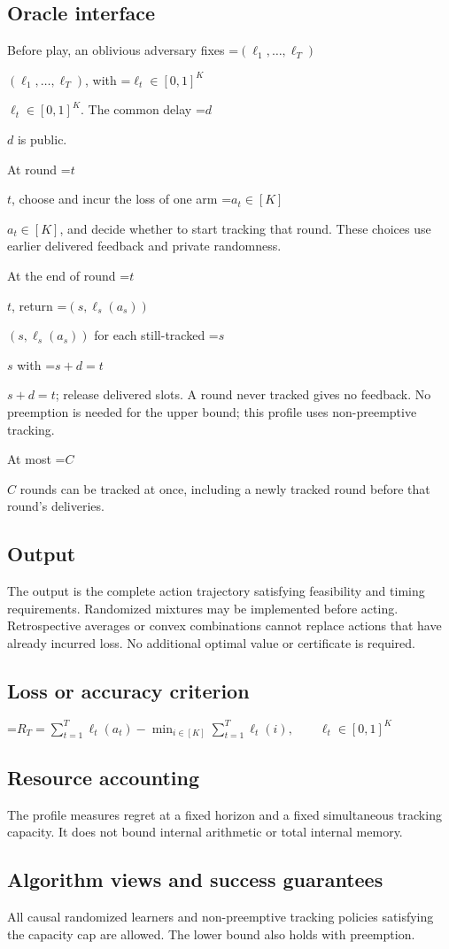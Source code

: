 \documentclass[10pt,a4paper]{article}
\newcommand{\AtlasMath}[1]{\par\begingroup\centering\setbox0=\hbox{$\displaystyle #1$}\ifdim\wd0>1.4\linewidth\typeout{ATLAS WIDE FORMULA: \the\wd0}\fi\ifdim\wd0>\linewidth\resizebox{\linewidth}{!}{\box0}\else\box0\fi\par\endgroup}
\newcommand{\AtlasInlineMath}[1]{\begingroup\setbox0=\hbox{$#1$}\ifdim\wd0>.4\linewidth\endgroup\AtlasMath{#1}\else\endgroup$#1$\fi}
\begin{document}
\subsection{Oracle interface}
Before play, an oblivious adversary fixes \AtlasInlineMath{(\ell_1,\ldots,\ell_T)}, with \AtlasInlineMath{\ell_t\in[0,1]^K}. The common delay \AtlasInlineMath{d} is public.

At round \AtlasInlineMath{t}, choose and incur the loss of one arm \AtlasInlineMath{a_t\in[K]}, and decide whether to start tracking that round. These choices use earlier delivered feedback and private randomness.

At the end of round \AtlasInlineMath{t}, return \AtlasInlineMath{(s,\ell_s(a_s))} for each still-tracked \AtlasInlineMath{s} with \AtlasInlineMath{s+d=t}; release delivered slots. A round never tracked gives no feedback. No preemption is needed for the upper bound; this profile uses non-preemptive tracking.

At most \AtlasInlineMath{C} rounds can be tracked at once, including a newly tracked round before that round's deliveries.

\subsection{Output}
The output is the complete action trajectory satisfying feasibility and timing requirements. Randomized mixtures may be implemented before acting. Retrospective averages or convex combinations cannot replace actions that have already incurred loss. No additional optimal value or certificate is required.

\subsection{Loss or accuracy criterion}

\AtlasMath{R_T=\sum_{t=1}^T\ell_t(a_t)-\min_{i\in[K]}\sum_{t=1}^T\ell_t(i),\qquad \ell_t\in[0,1]^K}


\subsection{Resource accounting}
The profile measures regret at a fixed horizon and a fixed simultaneous tracking capacity. It does not bound internal arithmetic or total internal memory.

\subsection{Algorithm views and success guarantees}
All causal randomized learners and non-preemptive tracking policies satisfying the capacity cap are allowed. The lower bound also holds with preemption.
\end{document}
